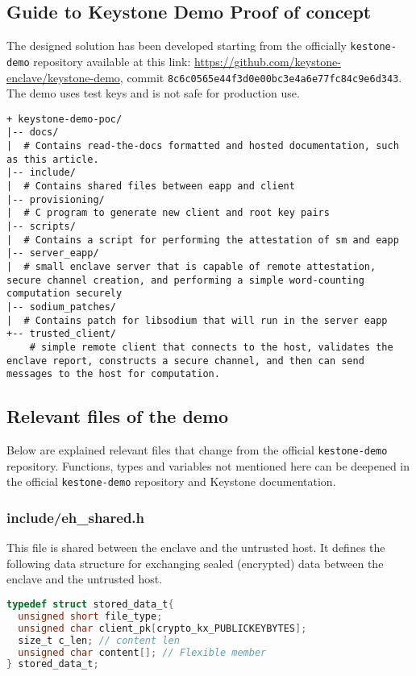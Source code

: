\subsection{Guide to Keystone Demo Proof of concept}
The designed solution has been developed starting from the officially \texttt{kestone-demo} repository available at this link: \url{https://github.com/keystone-enclave/keystone-demo}, commit \texttt{8c6c0565e44f3d0e00bc3e4a6e77fc84c9e6d343}. The demo uses test keys and is not safe for production use. \\
\begin{lstlisting}[frame=single]
+ keystone-demo-poc/
|-- docs/
|  # Contains read-the-docs formatted and hosted documentation, such as this article.
|-- include/
|  # Contains shared files between eapp and client
|-- provisioning/
|  # C program to generate new client and root key pairs
|-- scripts/
|  # Contains a script for performing the attestation of sm and eapp
|-- server_eapp/
|  # small enclave server that is capable of remote attestation, secure channel creation, and performing a simple word-counting computation securely
|-- sodium_patches/
|  # Contains patch for libsodium that will run in the server eapp
+-- trusted_client/
    # simple remote client that connects to the host, validates the enclave report, constructs a secure channel, and then can send messages to the host for computation.       
\end{lstlisting}

\subsection{Relevant files of the demo}
Below are explained relevant files that change from the official \texttt{kestone-demo} repository.
Functions, types and variables not mentioned here can be deepened in the official \texttt{kestone-demo} repository and Keystone documentation.
\subsubsection{include/eh\_shared.h}
This file is shared between the enclave and the untrusted host. It defines the following data structure for exchanging sealed (encrypted) data between the enclave and the untrusted host. \\

\begin{lstlisting}[language=C,frame=single]
typedef struct stored_data_t{
  unsigned short file_type;
  unsigned char client_pk[crypto_kx_PUBLICKEYBYTES];
  size_t c_len; // content len 
  unsigned char content[]; // Flexible member
} stored_data_t;    
\end{lstlisting}

